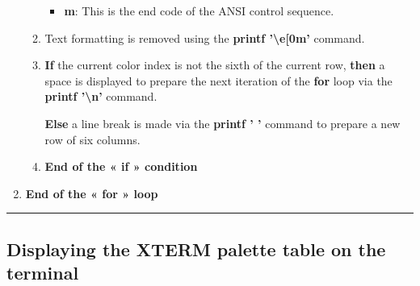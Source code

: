 \documentclass[a4paper,10pt]{article}
\begin{document}
\begin{justify}
\begin{enumerate}
\begin{enumerate}
\begin{itemize}
                    \item \textbf{m}: This is the end code of the ANSI control sequence.
                \end{itemize}

                \setlength{\parskip}{1em}

                \item Text formatting is removed using the \textbf{\color{cmds}printf '\textbackslash{e}[0m'} command.

                \item
                {
                    \textbf{\color{cond}If} the current color index is not the sixth of the current row, \textbf{\color{cond}then} a space is displayed to prepare the next iteration of the \textbf{\color{loop}for} loop via the \textbf{\color{cmds}printf '\textbackslash{n}'} command.

                    \textbf{\color{cond}Else} a line break is made via the \textbf{\color{cmds}printf ' '} command to prepare a new row of six columns.
                }

                \item \textbf{\color{cond}End of the « if » condition}
            \end{enumerate}

            \item \textbf{\color{loop}End of the « for » loop}
    	\end{enumerate}



    \end{justify}




    \newpage

    \color{sec2}\par\noindent\rule{\textwidth}{0.4pt}\color{text}

    \color{sec2}
    \subsection{Displaying the XTERM palette table on the terminal}\color{text}
\end{document}
